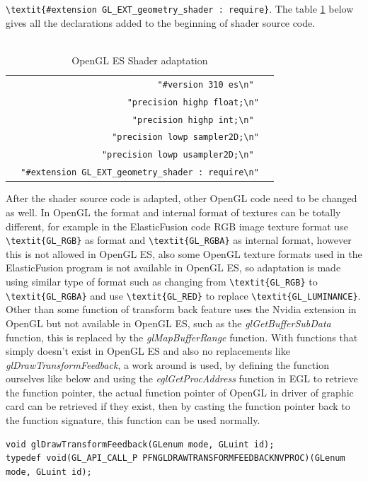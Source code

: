 \documentclass[12pt,twoside]{article}
\begin{document}
\verb|\textit{#extension GL_EXT_geometry_shader : require}|. The table \ref{table:OpenGL ES Shader} below gives all the declarations added to the beginning of shader source code.\\
\\
\begin{table}
\centering
\caption{OpenGL ES Shader adaptation}
\label{table:OpenGL ES Shader}
\begin{tabular}{|r|l|}
  \hline
  \verb| "#version 310 es\n" |\\
  \verb| "precision highp float;\n"| \\
  \verb|   "precision highp int;\n" |\\
   \verb|    "precision lowp sampler2D;\n"| \\
   \verb|  "precision lowp usampler2D;\n" |\\
 \verb|  "#extension GL_EXT_geometry_shader : require\n"| \\
    \hline
\end{tabular}
\end{table}
After the shader source code is adapted, other OpenGL code need to be changed as well. In OpenGL the format and internal format of textures can be totally different, for example in the ElasticFusion code RGB image texture format use \verb|\textit{GL_RGB}| as format and \verb|\textit{GL_RGBA}| as internal format, however this is not allowed in OpenGL ES, also some OpenGL texture formats used in the ElasticFusion program is not available in OpenGL ES, so adaptation is made using similar type of format such as changing from \verb|\textit{GL_RGB}| to \verb|\textit{GL_RGBA}| and use \verb|\textit{GL_RED}| to replace \verb|\textit{GL_LUMINANCE}|. Other than some function of transform back feature uses the Nvidia extension in OpenGL but not available in OpenGL ES, such as the \textit{glGetBufferSubData} function, this is replaced by the \textit{glMapBufferRange} function. With functions that simply doesn't exist in OpenGL ES and also no replacements like \textit{glDrawTransformFeedback}, a work around is used, by defining the function ourselves like below and using the \textit{eglGetProcAddress} function in EGL to retrieve the function pointer, the actual function pointer of OpenGL in driver of graphic card can be retrieved if they exist, then by casting the function pointer back to the function signature, this function can be used normally.\\
\begin{lstlisting}
void glDrawTransformFeedback(GLenum mode, GLuint id);
typedef void(GL_API_CALL_P PFNGLDRAWTRANSFORMFEEDBACKNVPROC)(GLenum mode, GLuint id);
\end{lstlisting}
\end{document}
